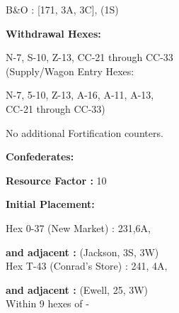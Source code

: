 \begin{scenariodata}
B\&O : [171, 3A, 3C], (1S)\\
\end{scenariodata}

\begin{scenariodata}
\textbf{Withdrawal Hexes:}\\
\end{scenariodata}

\begin{scenariodata}
N-7, S-10, Z-13, CC-21 through CC-33\\
(Supply/Wagon Entry Hexes:\\
\end{scenariodata}

\begin{scenariodata}
N-7, 5-10, Z-13, A-16, A-11, A-13,\\
CC-21 through CC-33)\\
\end{scenariodata}

\begin{scenariodata}
No additional Fortification counters.\\
\end{scenariodata}

\begin{scenariodata}
\textbf{Confederates:}\\
\end{scenariodata}

\begin{scenariodata}
\textbf{Resource Factor :} 10\\
\end{scenariodata}

\begin{scenariodata}
\textbf{Initial Placement:}\\
\end{scenariodata}

\begin{scenariodata}
Hex 0-37 (New Market) : 231,6A,\\
\end{scenariodata}

\begin{scenariodata}
\textbf{and adjacent :} (Jackson, 3S, 3W)\\
Hex T-43 (Conrad's Store) : 241, 4A,\\
\end{scenariodata}

\begin{scenariodata}
\textbf{and adjacent :} (Ewell, 25, 3W)\\
Within 9 hexes of -\\
\end{scenariodata}

